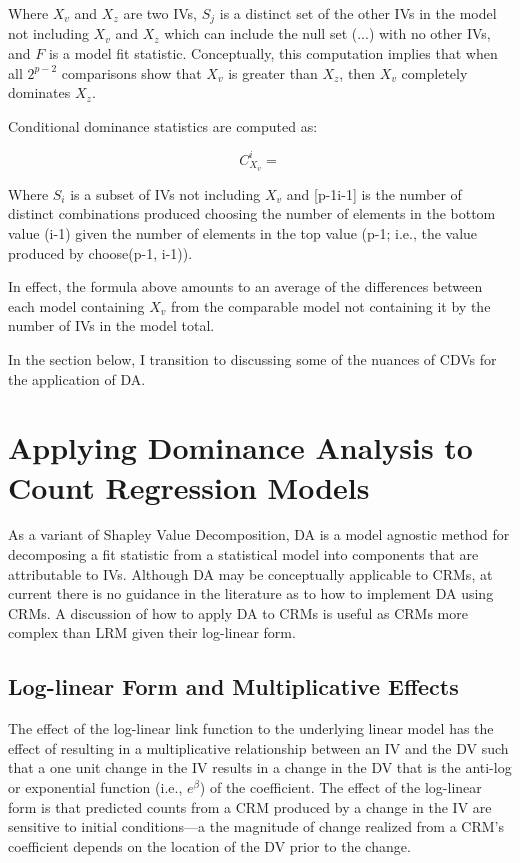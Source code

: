 \documentclass[ShortAfour,times,sageapa]{sagej}
\begin{document}
	Where $X_v$ and $X_z$ are two IVs, $S_j$ is a distinct set of the other IVs in the model not including $X_v$ and $X_z$ which can include the null set (...) with no other IVs, and $F$ is a model fit statistic. Conceptually, this computation implies that when all $2^{p-2}$ comparisons show that $X_v$ is greater than $X_z$, then $X_v$ completely dominates $X_z$.
	
	Conditional dominance statistics are computed as:
	
	\begin{equation}
		C^{i}_{X_v} =
	\end{equation}
	
	Where $S_i$ is a subset of IVs not including $X_v$ and [p-1i-1] is the number of distinct combinations produced choosing the number of elements in the bottom value (i-1) given the number of elements in the top value (p-1; i.e., the value produced by choose(p-1, i-1)).
	
	In effect, the formula above amounts to an average of the differences between each model containing $X_v$ from the comparable model not containing it by the number of IVs in the model total.
	
	In the section below, I transition to discussing some of the nuances of CDVs for the application of DA.
	
\section{Applying Dominance Analysis to Count Regression Models}

	As a variant of Shapley Value Decomposition, DA is a model agnostic method for decomposing a fit statistic from a statistical model into components that are attributable to IVs.
	Although DA may be conceptually applicable to CRMs, at current there is no guidance in the literature as to how to implement DA using CRMs.
	A discussion of how to apply DA to CRMs is useful as CRMs more complex than LRM given their log-linear form.  
	
	\subsection{Log-linear Form and Multiplicative Effects}
	
	The effect of the log-linear link function to the underlying linear model has the effect of resulting in a multiplicative relationship between an IV and the DV %
	such that a one unit change in the IV results in a change in the DV that is the anti-log or exponential function (i.e., $e^{\beta}$) of the coefficient.  
	The effect of the log-linear form is that predicted counts from a CRM produced by a change in the IV are sensitive to initial conditions---a the magnitude of change realized from a CRM's coefficient depends on the location of the DV prior to the change.  
	
\end{document}
